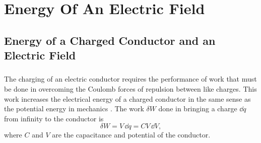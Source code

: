 





\chapter{Energy Of An Electric Field}
\label{ch-19}

\section{Energy of a Charged Conductor and an Electric Field}
\label{sec-19.1}

\subsection{}\label{19.1.1} The charging of an electric conductor requires the performance of work that must be done in overcoming the Coulomb forces of repulsion between like charges. This work increases the electrical energy of a charged conductor in the same sense as the potential energy in mechanics . The work $\delta W$ done in bringing a charge $\dd q$ from infinity to the conductor is
\begin{equation*}%
\delta W = V \, \dd q = CV \, \dd V,
\end{equation*}
where $C$ and $V$ are the capacitance and potential of the conductor.

